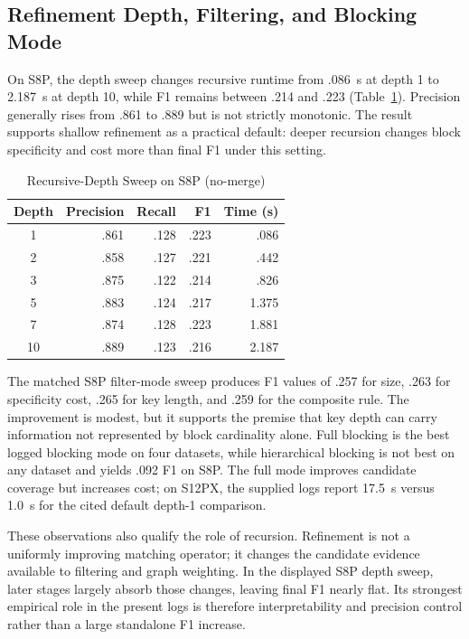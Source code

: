 \documentclass[conference]{IEEEtran}
\begin{document}
\subsection{Refinement Depth, Filtering, and Blocking Mode}
On S8P, the depth sweep changes recursive runtime from .086~s at depth 1 to 2.187~s at depth 10, while F1 remains between .214 and .223 (Table~\ref{tab:depth}). Precision generally rises from .861 to .889 but is not strictly monotonic. The result supports shallow refinement as a practical default: deeper recursion changes block specificity and cost more than final F1 under this setting.

\begin{table}[t]
\caption{Recursive-Depth Sweep on S8P (no-merge)}
\label{tab:depth}
\centering
\scriptsize
\setlength{\tabcolsep}{3.2pt}
\begin{tabular}{crrrr}
\toprule
Depth & Precision & Recall & F1 & Time (s) \\
\midrule
1  & .861 & .128 & .223 & .086 \\
2  & .858 & .127 & .221 & .442 \\
3  & .875 & .122 & .214 & .826 \\
5  & .883 & .124 & .217 & 1.375 \\
7  & .874 & .128 & .223 & 1.881 \\
10 & .889 & .123 & .216 & 2.187 \\
\bottomrule
\end{tabular}
\end{table}

The matched S8P filter-mode sweep produces F1 values of .257 for size, .263 for specificity cost, .265 for key length, and .259 for the composite rule. The improvement is modest, but it supports the premise that key depth can carry information not represented by block cardinality alone. Full blocking is the best logged blocking mode on four datasets, while hierarchical blocking is not best on any dataset and yields .092 F1 on S8P. The full mode improves candidate coverage but increases cost; on S12PX, the supplied logs report 17.5~s versus 1.0~s for the cited default depth-1 comparison.

These observations also qualify the role of recursion. Refinement is not a uniformly improving matching operator; it changes the candidate evidence available to filtering and graph weighting. In the displayed S8P depth sweep, later stages largely absorb those changes, leaving final F1 nearly flat. Its strongest empirical role in the present logs is therefore interpretability and precision control rather than a large standalone F1 increase.
\end{document}
